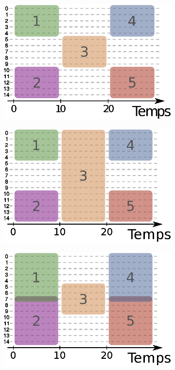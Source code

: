  
\begin{figure}
\centering
	\begin{subfigure}{0.3\textwidth}
		\includegraphics[width=\textwidth]{img/Qualite/topologie1.eps}
		\caption{}
		\label{fig:versqualite_gen_test1}
	\end{subfigure}
	\begin{subfigure}{0.3\textwidth}
		\includegraphics[width=\textwidth]{img/Qualite/topologie2.eps}
		\caption{}
		\label{fig:versqualite_gen_test2}
	\end{subfigure}
	\begin{subfigure}{0.3\textwidth}
		\includegraphics[width=\textwidth]{img/Qualite/topologie3.eps}

\end{subfigure}
\end{figure}
